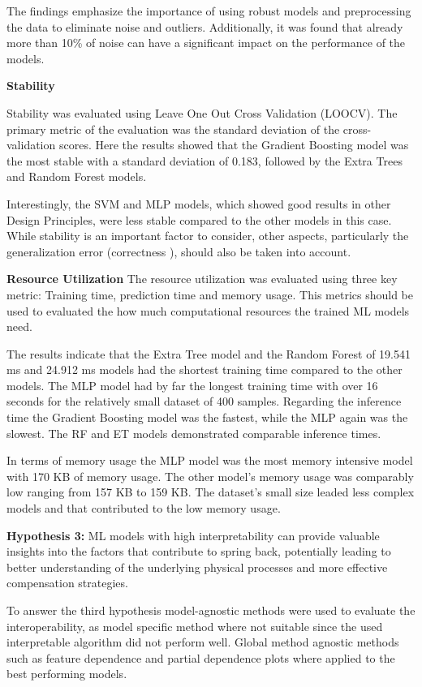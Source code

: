 The findings emphasize the importance of using robust models and preprocessing the data to eliminate noise and
outliers.
Additionally, it was found that already more than 10\% of noise can have a significant impact on the
performance of the models.


\textbf{Stability}

Stability was evaluated using Leave One Out Cross Validation (LOOCV).
The primary metric of the evaluation was the standard deviation of the cross-validation scores.
Here the results showed that the Gradient Boosting model was the most stable with a standard deviation of 0.183,
followed by the Extra Trees and Random Forest models.

Interestingly, the SVM and MLP models, which showed good results in other Design Principles, were less stable
compared to the other models in this case.
While stability is an important factor to consider, other aspects, particularly the generalization error (correctness
), should also be taken into account.

\textbf{Resource Utilization}
The resource utilization was evaluated using three key metric: Training time, prediction time and memory usage.
This metrics should be used to evaluated the how much computational resources the trained \ac{ML} models need.

The results indicate that the Extra Tree model and the Random Forest of 19.541 ms and 24.912 ms models had the shortest
training time compared to the other models.
The MLP model had by far the longest training time with over 16 seconds for the relatively small dataset of 400 samples.
Regarding the inference time the Gradient Boosting model was the fastest, while the MLP again was the slowest.
The RF and ET models demonstrated comparable inference times.

In terms of memory usage the MLP model was the most memory intensive model with 170 KB of memory usage.
The other model's memory usage was comparably low ranging from 157 KB to 159 KB.
The dataset's small size leaded less complex models and that contributed to the low memory usage.

\textbf{Hypothesis 3:} ML models with high interpretability can provide valuable insights into the factors that
contribute to spring back, potentially leading to better understanding of the underlying physical processes and
more effective compensation strategies.

To answer the third hypothesis model-agnostic methods were used to evaluate the interoperability, as model specific
method where not suitable since the used interpretable algorithm did not perform well.
Global method agnostic methods such as feature dependence and partial dependence plots where applied to the best
performing models.

